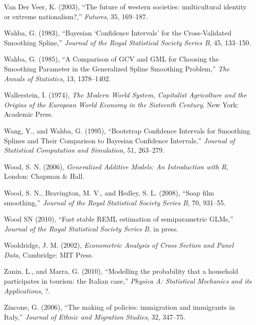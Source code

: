 \documentclass[10pt] {article}
\theoremstyle{definition}
\theoremstyle{plain}
\begin{document}
\begin{thebibliography}{99}
\bibitem{} Van Der Veer, K. (2003), ``The future of western societies: multicultural identity or extreme nationalism?,'' \textit{Futures}, 35, 169--187.

\bibitem{} Wahba, G. (1983), ``Bayesian `Confidence Intervals' for the Cross-Validated Smoothing Spline,'' \textit{Journal of the Royal Statistical Society Series B}, 45, 133--150.

\bibitem{} Wahba, G. (1985), ``A Comparison of GCV and GML for Choosing the Smoothing Parameter in the Generalized Spline Smoothing Problem,'' \textit{The Annals of Statistics}, 13, 1378--1402.

\bibitem{} Wallerstein, I. (1974), \textit{The Modern World System, Capitalist Agricolture and the Origins of the European World Economy in the Sixteenth Century}. New York: Academic Press.

\bibitem{} Wang, Y., and Wahba, G. (1995), ``Bootstrap Confidence Intervals for Smoothing Splines and Their Comparison to Bayesian Confidence Intervals,'' \textit{Journal of Statistical Computation and Simulation}, 51, 263--279.

\bibitem{} Wood, S. N. (2006), \textit{Generalized Additive Models: An Introduction with R}, London: Chapman $\&$ Hall.

\bibitem{} Wood, S. N., Bravington, M. V., and Hedley, S. L. (2008), ``Soap film smoothing,'' \textit{Journal of the Royal Statistical Society Series B}, 70, 931--55.

\bibitem{} Wood SN (2010), ``Fast stable REML estimation of semiparametric GLMs,'' \textit{Journal of the Royal Statistical Society Series B}, in press.

\bibitem{} Wooldridge, J. M. (2002), \textit{Econometric Analysis of Cross Section and Panel Data}, Cambridge: MIT Press.

\bibitem{} Zanin, L., and Marra, G. (2010), ``Modelling the probability that a household participates in tourism: the Italian case,'' \textit{Physica A: Statistical Mechanics and its Applications}, ?.

\bibitem{} Zincone, G. (2006), ``The making of policies: immigration and immigrants in Italy,'' \textit{Journal of Ethnic and Migration Studies}, 32, 347--75.


\end{thebibliography}
\end{document}
